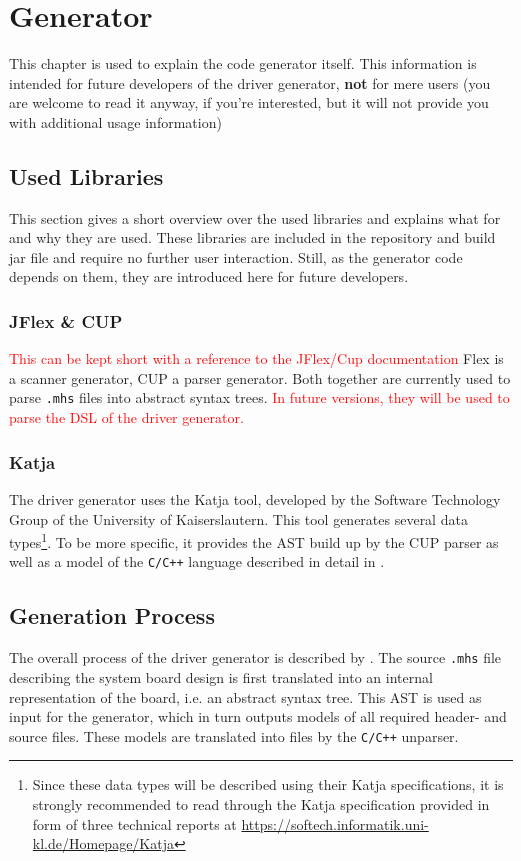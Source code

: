 \documentclass{report}
\begin{document}
\chapter{Generator}
This chapter is used to explain the code generator itself. This information is intended for future developers of the driver generator, \textbf{not} for mere users (you are welcome to read it anyway, if you're interested, but it will not provide you with additional usage information)

\section{Used Libraries}
This section gives a short overview over the used libraries and explains what for and why they are used. These libraries are included in the repository and build jar file and require no further user interaction. Still, as the generator code depends on them, they are introduced here for future developers.

\subsection{JFlex \& CUP}
\textcolor{red}{This can be kept short with a reference to the JFlex/Cup documentation}
Flex is a scanner generator, CUP a parser generator. Both together are currently used to parse \texttt{.mhs} files into abstract syntax trees. \textcolor{red}{In future versions, they will be used to parse the DSL of the driver generator.}

\subsection{Katja}
The driver generator uses the Katja tool, developed by the Software Technology Group of the University of Kaiserslautern. This tool generates several data types\footnote{Since these data types will be described using their Katja specifications, it is strongly recommended to read through the Katja specification provided in form of three technical reports at \url{https://softech.informatik.uni-kl.de/Homepage/Katja}}. To be more specific, it provides the AST build up by the CUP parser as well as a model of the \texttt{C/C++} language described in detail in .

\section{Generation Process}
\label{sec:genprocess}
The overall process of the driver generator is described by . The source \texttt{.mhs} file describing the system board design is first translated into an internal representation of the board, i.e. an abstract syntax tree. This AST is used as input for the generator, which in turn outputs models of all required header- and source files. These models are translated into files by the \texttt{C/C++} unparser.
\end{document}
